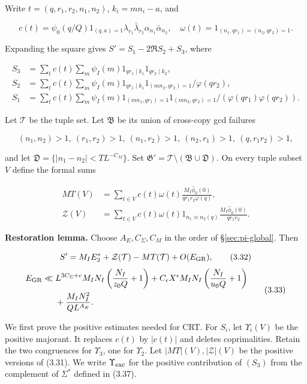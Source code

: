 Write $t=(q,r_1,r_2,n_1,n_2)$, $k_i=mn_i-a$, and

\[
c(t)=\psi_0(q/Q)1_{(q,a)=1}\lambda_{r_1}\bar\lambda_{r_2}
                       \alpha_{n_1}\bar\alpha_{n_2},
\quad \omega(t)=1_{(n_1,qr_1)=(n_2,qr_2)=1}.
\tag{3.28}
\]

Expanding the square gives $S'=S_1-2\Re S_2+S_3$, where

\[
\begin{aligned}
S_3&=\sum_t c(t)\sum_m\psi_I(m)1_{qr_1\mid k_1}1_{qr_2\mid k_2},\\
S_2&=\sum_t c(t)\sum_m\psi_I(m)
       1_{qr_1\mid k_1}1_{(mn_2,qr_2)=1}/\varphi(qr_2),\\
S_1&=\sum_t c(t)\sum_m\psi_I(m)
       1_{(mn_1,qr_1)=1}1_{(mn_2,qr_2)=1}/(\varphi(qr_1)\varphi(qr_2)).
\end{aligned}
\tag{3.29}
\]

Let $\mathcal T$ be the tuple set. Let $\mathfrak B$ be its union
of cross-copy gcd failures

\[
(n_1,n_2)>1,\ (r_1,r_2)>1,\ (n_1,r_2)>1,
\ (n_2,r_1)>1,\ (q,r_1r_2)>1,
\tag{3.30}
\]

and let $\mathfrak D=\{|n_1-n_2|<TL^{-C_M}\}$.
Set $\mathfrak G'=\mathcal T\setminus(\mathfrak B\cup\mathfrak D)$.
On every tuple subset $V$ define the formal sums

\[
\begin{aligned}
MT(V)&=\sum_{t\in V}c(t)\omega(t)
                \frac{M_I\widehat\phi_0(0)}{qr_1r_2\varphi(q)},\\
\mathcal Z(V)&=\sum_{t\in V}c(t)\omega(t)1_{n_1\equiv n_2(q)}
                \frac{M_I\widehat\phi_0(0)}{qr_1r_2}.
\end{aligned}
\tag{3.31}
\]

\textbf{Restoration lemma.} Choose $A_E,C_\Sigma,C_M$ in the order of \S\ref{sec:pi-global}. Then

\[
S'=M_IE_2^*+\mathcal Z(\mathcal T)-MT(\mathcal T)+O(E_{\rm GR}),
\tag{3.32}
\]
\[
\begin{aligned}
E_{\rm GR}\ll{}&L^{3C_\Sigma+c}M_IN_I\left(\frac{N_I}{z_0Q}+1\right)
 +C_\epsilon X^\epsilon M_IN_I\left(\frac{N_I}{u_0Q}+1\right)\\
&+\frac{M_IN_I^2}{QL^{A_E}}.
\end{aligned}
\tag{3.33}
\]

We first prove the positive estimates needed for CRT.
For $S_i$, let $\Upsilon_i(V)$ be the positive majorant.
It replaces $c(t)$ by $|c(t)|$ and deletes coprimalities.
Retain the two congruences for $\Upsilon_3$, one for $\Upsilon_2$.
Let $|MT|(V),|\mathcal Z|(V)$ be the positive versions of (3.31).
We write $\Upsilon_{\rm exc}$ for the positive contribution of
$(S_3)$ from the complement of $\Sigma^*$ defined in (3.37).

